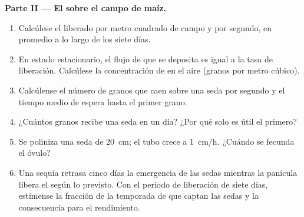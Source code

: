 \begin{problem}
\medskip
\noindent\textbf{Parte II --- El  sobre el campo de maíz.}
\begin{enumerate}[resume]
  \item Calcúlese el  liberado por metro cuadrado de campo y por
        segundo, en promedio a lo largo de los siete días.
  \item En estado estacionario, el flujo de  que se deposita es igual
        a la tasa de liberación. Calcúlese la concentración de  en
        el aire (granos por metro cúbico).
  \item Calcúlense el número de granos que caen sobre una seda por
        segundo y el tiempo medio de espera hasta el primer grano.
  \item ¿Cuántos granos recibe una seda en un día? ¿Por qué solo es útil
        el primero?
  \item Se poliniza una seda de \qty{20}{cm}; el tubo crece a
        \qty{1}{cm/h}. ¿Cuándo se fecunda el óvulo?
  \item Una sequía retrasa cinco días la emergencia de las sedas mientras
        la panícula libera el  según lo previsto. Con el periodo de
        liberación de siete días, estímense la fracción de la temporada de
         que captan las sedas y la consecuencia para el rendimiento.
\end{enumerate}


\end{problem}
